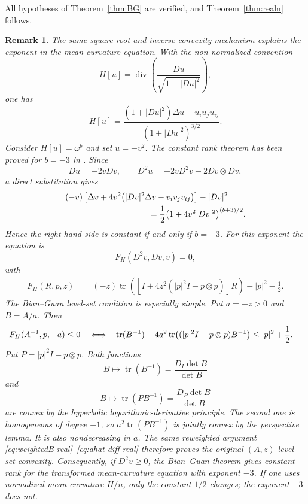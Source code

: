\documentclass{article}
\newtheorem{remark}[theorem]{Remark}
\newcommand{\tr}{\operatorname{tr}}
\numberwithin{equation}{section}
\begin{document}
All hypotheses of Theorem~\ref{thm:BG} are verified, and Theorem~\ref{thm:realn} follows.
\begin{remark}\label{rem:mean-curvature}
The same square-root and inverse-convexity mechanism explains the exponent in the mean-curvature equation. With the non-normalized convention
\[
H[u]=\operatorname{div}\left(\frac{Du}{\sqrt{1+|Du|^2}}\right),
\]
one has
\[
H[u]
=\frac{(1+|Du|^2)\Delta u-u_iu_ju_{ij}}{(1+|Du|^2)^{3/2}}.
\]
Consider $H[u]=\omega^b$ and set $u=-v^2$. The constant rank theorem has been proved for $b=-3$ in \cite{KL87}.
Since
\[
Du=-2vDv,
\qquad
D^2u=-2vD^2v-2Dv\otimes Dv,
\]
a direct substitution gives
\begin{align}
&(-v)\left[\Delta v+4v^2\bigl(|Dv|^2\Delta v-v_iv_jv_{ij}\bigr)\right]-|Dv|^2
\notag\\
&\hspace{35mm}
=\frac12\bigl(1+4v^2|Dv|^2\bigr)^{(b+3)/2}.
\label{eq:mean-general}
\end{align}
Hence the right-hand side is constant if and only if $b=-3$. For this exponent the equation is
\begin{equation}\label{eq:mean-v}
F_H(D^2v,Dv,v)=0,
\end{equation}
with
\begin{align}
F_H(R,p,z)
={}&(-z)\tr\left(\left[I+4z^2(|p|^2I-p\otimes p)\right]R\right)
-|p|^2-\frac12.
\label{eq:mean-F}
\end{align}
The Bian--Guan level-set condition is especially simple. Put $a=-z>0$ and $B=A/a$. Then
\begin{align}\label{eq:mean-level}
F_H(A^{-1},p,-a)\le0
\quad\Longleftrightarrow\quad
&\tr(B^{-1})\notag
+4a^2\tr\bigl((|p|^2I-p\otimes p)B^{-1}\bigr)
\le |p|^2+\frac12.
\end{align}
Put $P=|p|^2I-p\otimes p$. Both functions
\[
B\mapsto\tr(B^{-1})=\frac{D_I\det B}{\det B}
\]
and
\[
B\mapsto\tr(PB^{-1})=\frac{D_P\det B}{\det B}
\]
are convex by the hyperbolic logarithmic-derivative principle. The second one is homogeneous of degree $-1$, so $a^2\tr(PB^{-1})$ is jointly convex by the perspective lemma. It is also nondecreasing in $a$. The same reweighted argument \eqref{eq:weightedB-real}--\eqref{eq:ahat-diff-real} therefore proves the original $(A,z)$ level-set convexity. Consequently, if $D^2v\ge0$, the Bian--Guan theorem gives constant rank for the transformed mean-curvature equation with exponent $-3$. If one uses normalized mean curvature $H/n$, only the constant $1/2$ changes; the exponent $-3$ does not.
\end{remark}
\end{document}
